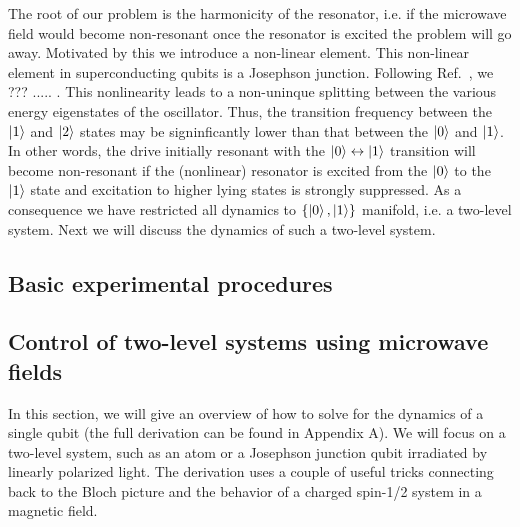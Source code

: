 \documentclass{../lab}
\begin{document}
The root of our problem is the harmonicity of the resonator, i.e. if the microwave field would become non-resonant once the resonator is excited the problem will go away. Motivated by this we introduce a non-linear element. This non-linear element in superconducting qubits is a Josephson junction. Following Ref.~\cite{}, we ??? ..... . This nonlinearity leads to a non-uninque splitting between the various energy eigenstates of the oscillator. Thus, the  transition frequency between the $\ket{1}$ and $\ket{2}$ states may be signinficantly lower than that between the $\ket{0}$ and $\ket{1}$. In other words,  the drive  initially resonant with the $\ket{0}\leftrightarrow\ket{1}$ transition will become non-resonant if the (nonlinear) resonator is excited from the $\ket{0}$ to the $\ket{1}$ state and excitation to higher lying states is strongly suppressed.  As a consequence we have restricted all dynamics to $\{\ket{0},\ket{1}\}$ manifold, i.e. a two-level system. Next we will discuss the dynamics of such a two-level system.   

\subsection{Basic experimental procedures}


\subsection{Control of two-level systems using microwave fields}
In this section, we will give an overview of how to solve for the dynamics of a single qubit (the full derivation can be found in Appendix A). We will focus on a two-level system, such as an atom or a Josephson junction qubit irradiated by linearly polarized light. The derivation uses a couple of useful tricks connecting back to the Bloch picture and the behavior of a charged spin-1/2 system in a magnetic field. 
\end{document}
